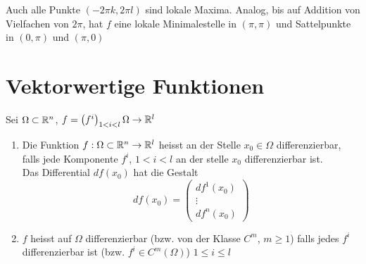 \begin{enumerate}
Auch alle Punkte $\left( -2\pi k,2\pi l\right)$ sind lokale Maxima. Analog, bis auf Addition von Vielfachen von $2\pi$, hat $f$ eine lokale Minimalestelle in $\left( \pi,\pi\right)$ und Sattelpunkte in $\left( 0,\pi\right)$ und $\left( \pi,0\right)$
\end{enumerate}

\section{Vektorwertige Funktionen}
Sei $\Omega\subset\mathbb{R}^n$, $f=\left( f^i\right)_{1 < i < l}\Omega\to\mathbb{R}^l$
\begin{definition}{8.57}
\begin{enumerate}
\item Die Funktion $f:\Omega\subset\mathbb{R}^n\to\mathbb{R}^l$ heisst an der Stelle $x_0\in\Omega$ differenzierbar, falls jede Komponente $f^i$, $1 < i < l$ an der stelle $x_0$ differenzierbar ist.\\

Das Differential $df\left( x_0\right)$ hat die Gestalt \[df\left( {{x_0}} \right) = \left( {\begin{array}{*{20}{c}}
{d{f^1}\left( {{x_0}} \right)}\\
{\vdots}\\
{d{f^n}\left( {{x_0}} \right)}
\end{array}} \right)\]
\item $f$ heisst auf $\Omega$ differenzierbar (bzw. von der Klasse $C^m$, $m\geq 1$) falls jedes $f^i$ differenzierbar ist (bzw. $f^i\in C^m\left( \Omega\right)$) $1\leq i \leq l$
\end{enumerate}
\end{definition}
